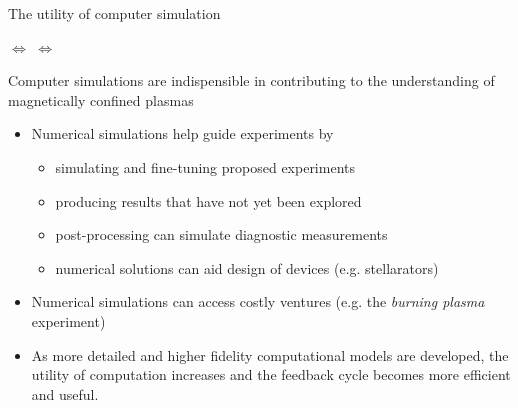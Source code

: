 \documentclass{beamer}
\begin{document}

\begin{frame}{The utility of computer simulation}
\begin{center}  $\Leftrightarrow$  $\Leftrightarrow$ \end{center}
Computer simulations are indispensible in contributing to the understanding of magnetically confined plasmas
\begin{itemize}
\item Numerical simulations help guide experiments by
  \begin{itemize}
    \item simulating and fine-tuning proposed experiments %
    \item producing results that have not yet been explored
    \item post-processing can simulate diagnostic measurements
    \item numerical solutions can aid design of devices (e.g. stellarators)
    \end{itemize}
\item Numerical simulations can access costly ventures (e.g. the \emph{burning plasma} experiment)
\item As more detailed and higher fidelity computational models are developed, the utility of computation increases and the feedback cycle becomes more efficient and useful.
\end{itemize}
\end{frame}

\end{document}
